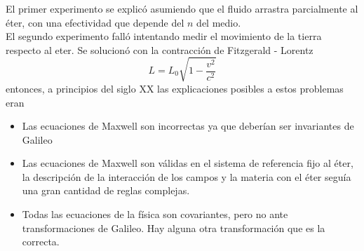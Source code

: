 El primer experimento se explicó asumiendo que el fluido arrastra parcialmente al éter, con una efectividad que depende del $n$ del medio.\\
\indent El segundo experimento falló intentando medir el movimiento de la tierra respecto al eter. Se solucionó con la contracción de Fitzgerald - Lorentz
\begin{equation*}
    L = L_{0}\sqrt{1 - \frac{v^{2}}{c^{2}}}
\end{equation*}
entonces, a principios del siglo XX las explicaciones posibles a estos problemas eran
\begin{itemize}
    \item Las ecuaciones de Maxwell son incorrectas ya que deberían ser invariantes de Galileo
    \item Las ecuaciones de Maxwell son válidas en el sistema de referencia fijo al éter, la descripción de la interacción de los campos y la materia con el éter seguía una gran cantidad de reglas complejas.
    \item Todas las ecuaciones de la física son covariantes, pero no ante transformaciones de Galileo. Hay alguna otra transformación que es la correcta.
\end{itemize}




